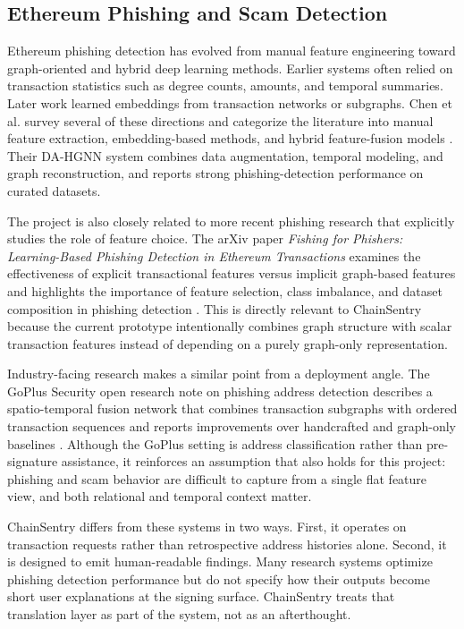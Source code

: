 \documentclass[11pt]{article}
\begin{document}
\subsection{Ethereum Phishing and Scam Detection}

Ethereum phishing detection has evolved from manual feature engineering toward graph-oriented and hybrid deep learning methods. Earlier systems often relied on transaction statistics such as degree counts, amounts, and temporal summaries. Later work learned embeddings from transaction networks or subgraphs. Chen et al. survey several of these directions and categorize the literature into manual feature extraction, embedding-based methods, and hybrid feature-fusion models \cite{chen2024dahgnn}. Their DA-HGNN system combines data augmentation, temporal modeling, and graph reconstruction, and reports strong phishing-detection performance on curated datasets.

The project is also closely related to more recent phishing research that explicitly studies the role of feature choice. The arXiv paper \emph{Fishing for Phishers: Learning-Based Phishing Detection in Ethereum Transactions} examines the effectiveness of explicit transactional features versus implicit graph-based features and highlights the importance of feature selection, class imbalance, and dataset composition in phishing detection \cite{alghuried2025fishing}. This is directly relevant to ChainSentry because the current prototype intentionally combines graph structure with scalar transaction features instead of depending on a purely graph-only representation.

Industry-facing research makes a similar point from a deployment angle. The GoPlus Security open research note on phishing address detection describes a spatio-temporal fusion network that combines transaction subgraphs with ordered transaction sequences and reports improvements over handcrafted and graph-only baselines \cite{goplus2025phishing}. Although the GoPlus setting is address classification rather than pre-signature assistance, it reinforces an assumption that also holds for this project: phishing and scam behavior are difficult to capture from a single flat feature view, and both relational and temporal context matter.

ChainSentry differs from these systems in two ways. First, it operates on transaction requests rather than retrospective address histories alone. Second, it is designed to emit human-readable findings. Many research systems optimize phishing detection performance but do not specify how their outputs become short user explanations at the signing surface. ChainSentry treats that translation layer as part of the system, not as an afterthought.
\end{document}
